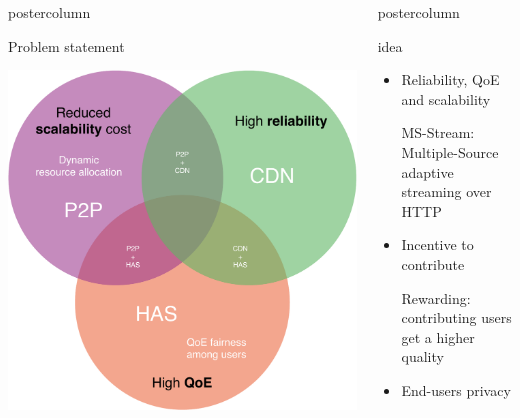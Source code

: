 \begin{frame}
\begin{columns}
\begin{column}{.49\textwidth}
\begin{beamercolorbox}[center,wd=\textwidth]{postercolumn}
\begin{minipage}[T]{.95\textwidth}
{            \vfill
            
            \begin{block}{Problem statement}
            
            \centering
            
            \includegraphics[width=.5\textwidth]{sample/SotA-cropped.pdf}
            
            \end{block}
            
          }
        \end{minipage}
      \end{beamercolorbox}
    \end{column}
    \begin{column}{.49\textwidth}
      \begin{beamercolorbox}[center,wd=\textwidth]{postercolumn}
        \begin{minipage}[T]{.95\textwidth}
          \parbox[t][\columnheight]{\textwidth}{
            
            \begin{block}{ idea}
            
            \begin{itemize}
            
            \item Reliability, QoE and scalability
            
            MS-Stream: Multiple-Source adaptive streaming over HTTP
            
            \item Incentive to contribute
            
            Rewarding: contributing users get a higher quality
            
            \item End-users privacy
            

\end{itemize}
\end{block}}
\end{minipage}
\end{beamercolorbox}
\end{column}
\end{columns}
\end{frame}
